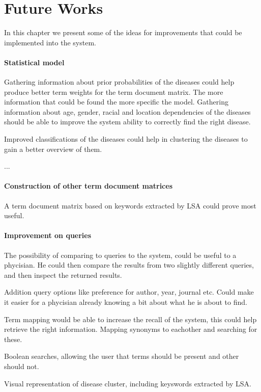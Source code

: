 \chapter{Future Works\label{FutureWorks}}

In this chapter we present some of the ideas for improvements that could be implemented into the system.

\subsubsection{Statistical model}
Gathering information about prior probabilities of the diseases could
help produce better term weights for the term document matrix. The
more information that could be found the more specific the
model. Gathering information about age, gender, racial and location
dependencies of the diseases should be able to improve the system
ability to correctly find the right disease.

Improved classifications of the diseases could help in clustering the
diseases to gain a better overview of them.

 ... 

\subsubsection{Construction of other term document matrices}
A term document matrix based on keywords extracted by LSA could prove
most useful.

\subsubsection{Improvement on queries}
The possibility of comparing to queries to the system, could be useful
to a phycisian. He could then compare the results from two slightly
different queries, and then inspect the returned results.

Addition query options like preference for author, year, journal
etc. Could make it easier for a phycisian already knowing a bit about
what he is about to find.

Term mapping would be able to increase the recall of the system, this
could help retrieve the right information. Mapping synonyms to
eachother and searching for these.

Boolean searches, allowing the user that terms should be present and
other should not.

Visual representation of disease cluster, including keyswords
extracted by LSA.

